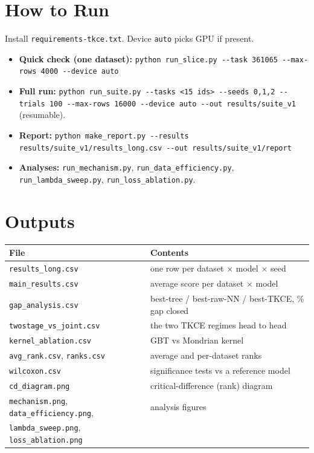 \documentclass[11pt]{article}
\newcommand{\code}[1]{\texttt{#1}}
\begin{document}
\section{How to Run}
Install \code{requirements-tkce.txt}. Device \code{auto} picks GPU if present.
\begin{itemize}[leftmargin=1.4em,itemsep=2pt]
  \item \textbf{Quick check (one dataset):}
  \code{python run\_slice.py -{}-task 361065 -{}-max-rows 4000 -{}-device auto}
  \item \textbf{Full run:}
  \code{python run\_suite.py -{}-tasks <15 ids> -{}-seeds 0,1,2 -{}-trials 100
  -{}-max-rows 16000 -{}-device auto -{}-out results/suite\_v1} (resumable).
  \item \textbf{Report:} \code{python make\_report.py -{}-results
  results/suite\_v1/results\_long.csv -{}-out results/suite\_v1/report}
  \item \textbf{Analyses:} \code{run\_mechanism.py}, \code{run\_data\_efficiency.py},
  \code{run\_lambda\_sweep.py}, \code{run\_loss\_ablation.py}.
\end{itemize}

\section{Outputs}
\begin{longtable}{@{}p{4.8cm} p{8.0cm}@{}}
\toprule \textbf{File} & \textbf{Contents} \\ \midrule \endhead
\code{results\_long.csv} & one row per dataset $\times$ model $\times$ seed \\
\code{main\_results.csv} & average score per dataset $\times$ model \\
\code{gap\_analysis.csv} & best-tree / best-raw-NN / best-TKCE, \% gap closed \\
\code{twostage\_vs\_joint.csv} & the two TKCE regimes head to head \\
\code{kernel\_ablation.csv} & GBT vs Mondrian kernel \\
\code{avg\_rank.csv}, \code{ranks.csv} & average and per-dataset ranks \\
\code{wilcoxon.csv} & significance tests vs a reference model \\
\code{cd\_diagram.png} & critical-difference (rank) diagram \\
\code{mechanism.png}, \code{data\_efficiency.png}, & analysis figures \\
\code{lambda\_sweep.png}, \code{loss\_ablation.png} & \\
\bottomrule
\end{longtable}
\end{document}
